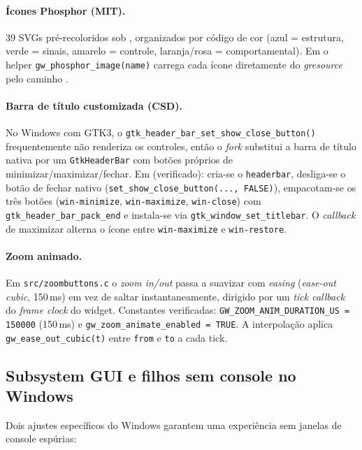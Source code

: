 \paragraph{Ícones Phosphor (MIT).} 39 SVGs pré-recoloridos sob
, organizados por código de cor (azul = estrutura, verde
= sinais, amarelo = controle, laranja/rosa = comportamental). Em  o
helper \lstinline|gw_phosphor_image(name)| carrega cada ícone diretamente do
\emph{gresource} pelo caminho
.

\paragraph{Barra de título customizada (CSD).} No Windows com GTK3, o
\lstinline|gtk_header_bar_set_show_close_button()| frequentemente não renderiza os
controles, então o \emph{fork} substitui a barra de título nativa por um
\lstinline|GtkHeaderBar| com botões próprios de minimizar/maximizar/fechar. Em
 (verificado): cria-se o \lstinline|headerbar|, desliga-se o botão
de fechar nativo (\lstinline|set_show_close_button(..., FALSE)|), empacotam-se os
três botões (\lstinline|win-minimize|, \lstinline|win-maximize|,
\lstinline|win-close|) com \lstinline|gtk_header_bar_pack_end| e instala-se via
\lstinline|gtk_window_set_titlebar|. O \emph{callback} de maximizar alterna o ícone
entre \lstinline|win-maximize| e \lstinline|win-restore|.

\paragraph{Zoom animado.} Em \texttt{src/zoombuttons.c} o \emph{zoom in/out} passa a
suavizar com \emph{easing} (\emph{ease-out cubic}, 150\,ms) em vez de saltar
instantaneamente, dirigido por um \emph{tick callback} do \emph{frame clock} do
widget. Constantes verificadas: \lstinline|GW_ZOOM_ANIM_DURATION_US = 150000| (150\,ms)
e \lstinline|gw_zoom_animate_enabled = TRUE|. A interpolação aplica
\lstinline|gw_ease_out_cubic(t)| entre \lstinline|from| e \lstinline|to| a cada tick.

\subsection{Subsystem GUI e filhos sem console no Windows}
\label{sec:cap10-gtkwave-windows}

Dois ajustes específicos do Windows garantem uma experiência sem janelas de
console espúrias:

